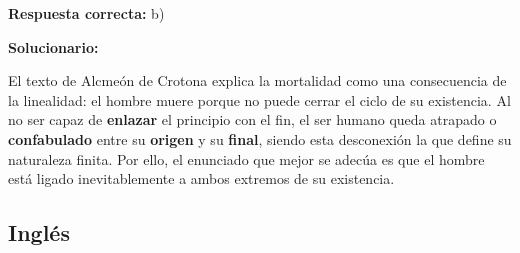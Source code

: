 \begin{enumerate}[resume]
\textbf{Respuesta correcta:} b)

\vspace{2mm}
\textbf{Solucionario:}

El texto de Alcmeón de Crotona explica la mortalidad como una consecuencia de la linealidad: el hombre muere porque no puede cerrar el ciclo de su existencia. Al no ser capaz de \textbf{enlazar} el principio con el fin, el ser humano queda atrapado o \textbf{confabulado} entre su \textbf{origen} y su \textbf{final}, siendo esta desconexión la que define su naturaleza finita. Por ello, el enunciado que mejor se adecúa es que el hombre está ligado inevitablemente a ambos extremos de su existencia.


\end{enumerate}



\subsection*{Inglés}

